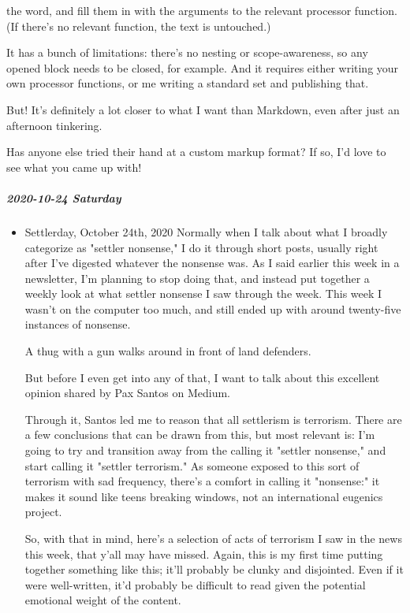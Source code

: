 \documentclass[11pt]{article}
\begin{document}
\begin{itemize}
the word, and fill them in with the arguments to the relevant processor function. (If there's no relevant function, the text is untouched.)

It has a bunch of limitations: there's no nesting or scope-awareness, so any opened block needs to be closed, for example. And it requires either writing your own processor functions, or me writing a standard set and publishing that.

But! It's definitely a lot closer to what I want than Markdown, even after just an afternoon tinkering.

Has anyone else tried their hand at a custom markup format? If so, I'd love to see what you came up with!
\end{itemize}
\subparagraph*{2020-10-24 Saturday}
\label{sec:orgbe4da92}
\begin{itemize}
\item Settlerday, October 24th, 2020
\label{sec:orgffb39a3}
Normally when I talk about what I broadly categorize as "settler nonsense," I do it through short posts, usually right after I've digested whatever the nonsense was. As I said earlier this week in a newsletter, I'm planning to stop doing that, and instead put together a weekly look at what settler nonsense I saw through the week. This week I wasn't on the computer too much, and still ended up with around twenty-five instances of nonsense.

A thug with a gun walks around in front of land defenders.

But before I even get into any of that, I want to talk about this excellent opinion shared by Pax Santos on Medium.

Through it, Santos led me to reason that all settlerism is terrorism. There are a few conclusions that can be drawn from this, but most relevant is: I'm going to try and transition away from the calling it "settler nonsense," and start calling it "settler terrorism." As someone exposed to this sort of terrorism with sad frequency, there's a comfort in calling it "nonsense:" it makes it sound like teens breaking windows, not an international eugenics project.

So, with that in mind, here's a selection of acts of terrorism I saw in the news this week, that y'all may have missed. Again, this is my first time putting together something like this; it'll probably be clunky and disjointed. Even if it were well-written, it'd probably be difficult to read given the potential emotional weight of the content.


\end{itemize}
\end{document}
